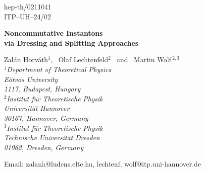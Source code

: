 \documentclass[a4paper,11pt,english]{article}
\numberwithin{equation}{section}
\renewcommand{\=}{\ =\ }
\begin{document}
\begin{titlepage}

\begin{flushright}
hep-th/0211041\\
ITP--UH--24/02\\
\end{flushright}

\vskip 2.0cm

\begin{center}

{\LARGE\bf Noncommutative Instantons \\[12pt]
           via Dressing and Splitting Approaches}

\vspace*{0.4in}

{\Large 
Zal\'an Horv\'ath$^1$, \ Olaf Lechtenfeld$^2$ \ and \ Martin Wolf\,$^{2,3}$
}\\[0.4in]

  {\em $^1$Department of Theoretical Physics\\
       E\"otv\"os University\\
       1117, Budapest, Hungary\\[0.2in]

       $^2$Institut f\"ur Theoretische Physik\\
       Universit\"at Hannover\\
       30167, Hannover, Germany\\[0.2in]

       $^3$Institut f\"ur Theoretische Physik\\
       Technische Universit\"at Dresden\\
       01062, Dresden, Germany}

\vspace*{0.2in}

Email: zalanh@ludens.elte.hu, lechtenf, wolf@itp.uni-hannover.de

\end{center}

\vspace*{0.4in}

\begin{abstract}
\noindent
Almost all known instanton solutions in noncommutative Yang-Mills theory 
have been obtained in the modified ADHM scheme. In this paper we employ 
two alternative methods for the construction of the self-dual $U(2)$ BPST 
instanton on a noncommutative Euclidean four-dimensional space with 
self-dual noncommutativity tensor. Firstly, we use the method of dressing 
transformations, an iterative procedure for generating solutions from a 
given seed solution, and thereby generalize Belavin's and Zakharov's work 
to the noncommutative setup. Secondly, we relate the dressing approach 
with Ward's splitting method based on the twistor construction and rederive 
the solution in this context. It seems feasible to produce nonsingular
noncommutative multi-instantons with these techniques.
\end{abstract}

\end{titlepage}
\end{document}
